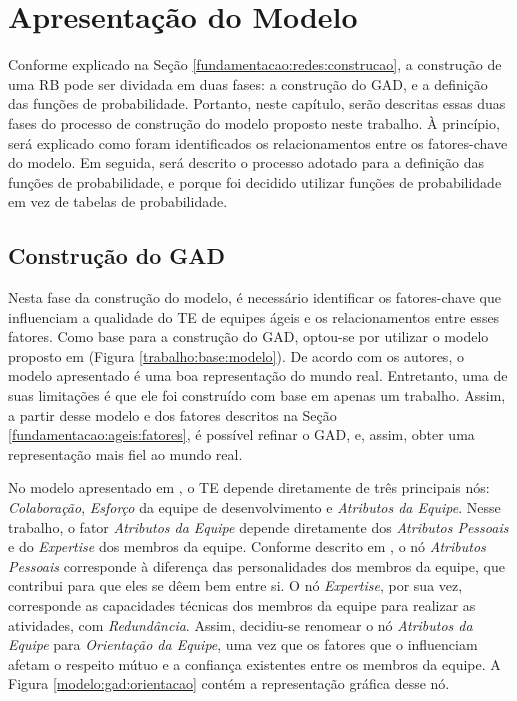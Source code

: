 \chapter{Apresentação do Modelo}
\label{modelo}

Conforme explicado na Seção \ref{fundamentacao:redes:construcao}, a construção de uma RB pode ser dividada em duas fases: a construção do GAD, e a definição das funções de probabilidade. Portanto, neste capítulo, serão descritas essas duas fases do processo de construção do modelo proposto neste trabalho. À princípio, será explicado como foram identificados os relacionamentos entre os fatores-chave do modelo. Em seguida, será descrito o processo adotado para a definição das funções de probabilidade, e porque foi decidido utilizar funções de probabilidade em vez de tabelas de probabilidade.

\section{Construção do GAD}
\label{modelo:gad}

Nesta fase da construção do modelo, é necessário identificar os fatores-chave que influenciam a qualidade do TE de equipes ágeis e os relacionamentos entre esses fatores. Como base para a construção do GAD, optou-se por utilizar o modelo proposto em \cite{freire} (Figura \ref{trabalho:base:modelo}). De acordo com os autores, o modelo apresentado é uma boa representação do mundo real. Entretanto, uma de suas limitações é que ele foi construído com base em apenas um trabalho. Assim, a partir desse modelo e dos fatores descritos na Seção \ref{fundamentacao:ageis:fatores}, é possível refinar o GAD, e, assim, obter uma representação mais fiel ao mundo real.

No modelo apresentado em \cite{freire}, o TE depende diretamente de três principais nós: \textit{Colaboração}, \textit{Esforço} da equipe de desenvolvimento e \textit{Atributos da Equipe}. Nesse trabalho, o fator \textit{Atributos da Equipe} depende diretamente dos \textit{Atributos Pessoais} e do \textit{Expertise} dos membros da equipe. Conforme descrito em \cite{freire}, o nó \textit{Atributos Pessoais} corresponde à diferença das personalidades dos membros da equipe, que contribui para que eles se dêem bem entre si. O nó \textit{Expertise}, por sua vez, corresponde as capacidades técnicas dos membros da equipe para realizar as atividades, com \textit{Redundância}. Assim, decidiu-se renomear o nó \textit{Atributos da Equipe} para \textit{Orientação da Equipe}, uma vez que os fatores que o influenciam afetam o respeito mútuo e a confiança existentes entre os membros da equipe. A Figura \ref{modelo:gad:orientacao} contém a representação gráfica desse nó.

